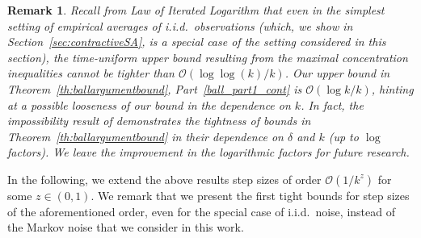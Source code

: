 \documentclass{article}
\newtheorem{remark}{Remark}
\begin{document}
\begin{remark} Recall from Law of Iterated Logarithm that even in the simplest setting of empirical averages of i.i.d.\ observations (which, we show in Section~\ref{sec:contractiveSA}, is a special case of the setting considered in this section), the time-uniform upper bound resulting from the maximal concentration inequalities cannot be tighter than $\mathcal{O}(\log\log(k)/k)$. Our upper bound in Theorem~\ref{th:ballargumentbound}, Part~\ref{ball_part1_cont} is $\mathcal{O}(\log k/k)$, hinting at a possible looseness of our bound in the dependence on $k$. In fact, the impossibility result of \citet[Section 2.2]{chen2025concentration} demonstrates the tightness of bounds in Theorem~\ref{th:ballargumentbound} in their dependence on $\delta$ and $k$ (up to $\log$ factors). We leave the improvement in the logarithmic factors for future research.
\end{remark}

In the following, we extend the above results step sizes of order $\mathcal{O}(1/k^z)$ for some $z\in(0,1)$. %
We remark that we present the first tight bounds for step sizes of the aforementioned order, even for the special case of i.i.d.\ noise, instead of the Markov noise that we consider in this work. %
\end{document}
